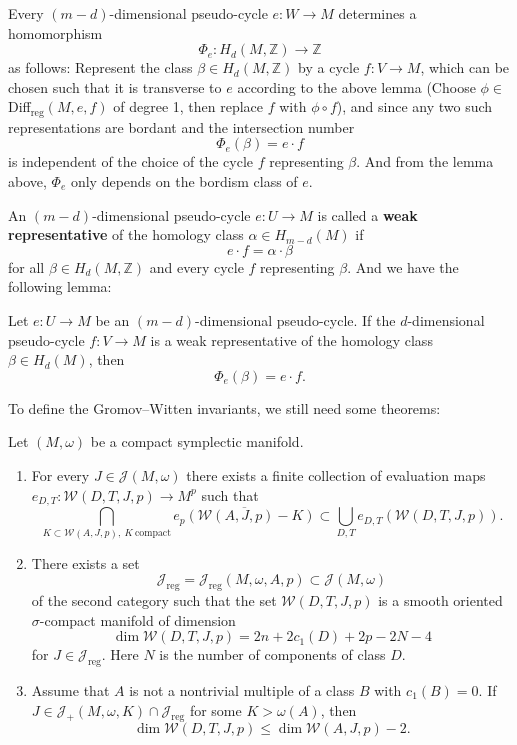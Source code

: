 \documentclass[twoside]{article}
\begin{document}
Every $(m-d)$-dimensional pseudo-cycle $e\colon W\rightarrow M$ determines a homomorphism
\[\Phi_e\colon H_d(M,\mathbb{Z})\rightarrow \mathbb{Z}\]
as follows:
Represent the class $\beta\in H_d(M,\mathbb{Z})$ by a cycle $f\colon V\rightarrow M$, 
which can be chosen such that it is transverse to $e$ according to the above lemma
(Choose $\phi\in$Diff$_{\mathrm{reg}}(M,e,f)$ of degree 1, 
then replace $f$ with $\phi\circ f$), 
and since any two such representations are bordant and the intersection number
\[\Phi_e(\beta)=e\cdot f\]
is independent of the choice of the cycle $f$ representing $\beta$. 
And from the lemma above, $\Phi_e$ only depends on the bordism class of $e$.

An $(m-d)$-dimensional pseudo-cycle $e\colon U\rightarrow M$ 
is called a \textbf{weak representative} of the homology class $\alpha\in H_{m-d}(M)$ if 
\[e\cdot f=\alpha\cdot\beta\]
for all $\beta\in H_d(M,\mathbb{Z})$ and every cycle $f$ representing $\beta$. 
And we have the following lemma:

\begin{lemma}
Let $e\colon U\rightarrow M$ be an $(m-d)$-dimensional pseudo-cycle. 
If the $d$-dimensional pseudo-cycle $f\colon V\rightarrow M$ is 
a weak representative of the homology class $\beta\in H_d(M)$, then 
\[\Phi_e(\beta)=e\cdot f.\]
\end{lemma}

To define the Gromov--Witten invariants, we still need some theorems:

\begin{theorem}
Let $(M,\omega)$ be a compact symplectic manifold.
    \begin{enumerate}
        \item For every $J\in\mathscr{J}(M,\omega)$ there exists 
        a finite collection of evaluation maps $e_{D,T}\colon \mathscr{W}(D,T,J,p)\rightarrow M^p$ such that
        \[\bigcap_{K\subset \mathscr{W}(A,J,p),\: K\: \mathrm{compact}}\overline{e_p(\mathscr{W}(A,J,p)-K)}\subset \bigcup_{D,T}e_{D,T}(\mathscr{W}(D,T,J,p)).\]
        \item There exists a set 
        \[\mathscr{J}_{\mathrm{reg}}=\mathscr{J}_{\mathrm{reg}}(M,\omega,A,p)\subset \mathscr{J}(M,\omega)\]
        of the second category such that the set $\mathscr{W}(D,T,J,p)$ is a smooth oriented $\sigma$-compact manifold of dimension 
        \[\dim \mathscr{W}(D,T,J,p)=2n+2c_1(D)+2p-2N-4\]
        for $J\in\mathscr{J}_{\mathrm{reg}}$. Here $N$ is the number of components of class $D$.
        \item Assume that  $A$ is not a nontrivial multiple of a class 
        $B$ with $c_1(B)=0$. If $J\in\mathscr{J}_+(M,\omega,K)\cap \mathscr{J}_{\mathrm{reg}}$ for some $K>\omega(A)$, then
        \[\dim \mathscr{W}(D,T,J,p)\leq \dim\mathscr{W}(A,J,p)-2.\]
    \end{enumerate}
\end{theorem}
\end{document}
